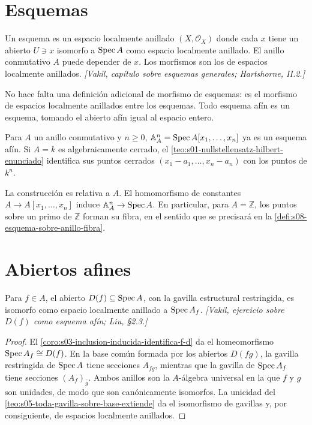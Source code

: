 \section{Esquemas}

\begin{defi}[Esquema]
\label{defi:s07-esquema}
Un esquema es un espacio localmente anillado $(X,\mathcal O_X)$ donde cada $x$ tiene un abierto $U\ni x$ isomorfo a $\operatorname{Spec} A$ como espacio localmente anillado. El anillo conmutativo $A$ puede depender de $x$. Los morfismos son los de espacios localmente anillados. \emph{[Vakil, capítulo sobre esquemas generales; Hartshorne, II.2.]}
\end{defi}

\begin{obs}
\label{obs:s07-no-hace-falta-definicion-adicional}
No hace falta una definición adicional de morfismo de esquemas: es el morfismo de espacios localmente anillados entre los esquemas. Todo esquema afín es un esquema, tomando el abierto afín igual al espacio entero.
\end{obs}

\begin{ejem}
\label{ejem:s07-espacio-afin-n}
Para $A$ un anillo conmutativo y $n\geq0$, $\mathbb A_A^n=\operatorname{Spec} A[x_1,\ldots,x_n]$ ya es un esquema afín. Si $A=k$ es algebraicamente cerrado, el \cref{teo:s01-nullstellensatz-hilbert-enunciado} identifica sus puntos cerrados $(x_1-a_1,\ldots,x_n-a_n)$ con los puntos de $k^n$.

La construcción es relativa a $A$. El homomorfismo de constantes $A\to A[x_1,\ldots,x_n]$ induce $\mathbb A_A^n\to\operatorname{Spec} A$. En particular, para $A=\mathbb Z$, los puntos sobre un primo de $\mathbb Z$ forman su fibra, en el sentido que se precisará en la \cref{defi:s08-esquema-sobre-anillo-fibra}.
\end{ejem}

\section{Abiertos afines}

\begin{prop}
\label{prop:s07-d-f-abierto-afin}
Para $f\in A$, el abierto $D(f)\subseteq\operatorname{Spec} A$, con la gavilla estructural restringida, es isomorfo como espacio localmente anillado a $\operatorname{Spec} A_f$. \emph{[Vakil, ejercicio sobre $D(f)$ como esquema afín; Liu, \S2.3.]}
\end{prop}
\begin{proof}
El \cref{coro:s03-inclusion-inducida-identifica-f-d} da el homeomorfismo $\operatorname{Spec} A_f\cong D(f)$. En la base común formada por los abiertos $D(fg)$, la gavilla restringida de $\operatorname{Spec} A$ tiene secciones $A_{fg}$, mientras que la gavilla de $\operatorname{Spec} A_f$ tiene secciones $(A_f)_{\bar g}$. Ambos anillos son la $A$-álgebra universal en la que $f$ y $g$ son unidades, de modo que son canónicamente isomorfos. La unicidad del \cref{teo:s05-toda-gavilla-sobre-base-extiende} da el isomorfismo de gavillas y, por consiguiente, de espacios localmente anillados.
\end{proof}

